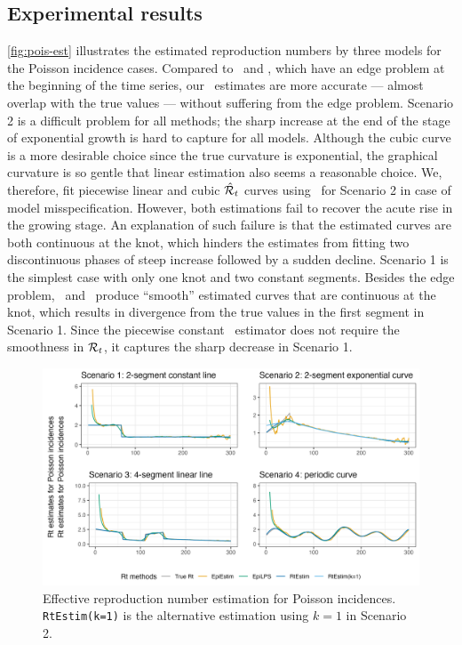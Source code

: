 \subsection{Experimental results}

\autoref{fig:pois-est} illustrates the estimated reproduction numbers by three models for the Poisson incidence cases. Compared to \EpiEstim\ and \EpiLPS, which have an edge problem at the beginning of the time series, our \RtEstim\ estimates are more accurate --- almost overlap with the true values --- without suffering from the edge problem. Scenario 2 is a difficult problem for all methods; the sharp increase at the end of the stage of exponential growth is hard to capture for all models. Although the cubic curve is a more desirable choice since the true curvature is exponential, the graphical curvature is so gentle that linear estimation also seems a reasonable choice. We, therefore, fit piecewise linear and cubic $\hat{\mathcal{R}}_t$ curves using \RtEstim\ for Scenario 2 in case of model misspecification. However, both estimations fail to recover the acute rise in the growing stage. An explanation of such failure is that the estimated curves are both continuous at the knot, which hinders the estimates from fitting two discontinuous phases of steep increase followed by a sudden decline. 
Scenario 1 is the simplest case with only one knot and two constant segments. Besides the edge problem, \EpiEstim\ and \EpiLPS\ produce ``smooth'' estimated curves that are continuous at the knot, which results in divergence from the true values in the first segment in Scenario 1. Since the piecewise constant \RtEstim\ estimator does not require the smoothness in $\mathcal{R}_t$, it captures the sharp decrease in Scenario 1. 
\begin{figure}[tb]
    \centering
    \includegraphics*[width=160mm]{fig/Pois-res-plot.png}
    \caption{Effective reproduction number estimation for Poisson incidences. \texttt{RtEstim(k=1)} is the alternative estimation using $k=1$ in Scenario 2.}
    \label{fig:pois-est}
\end{figure}


